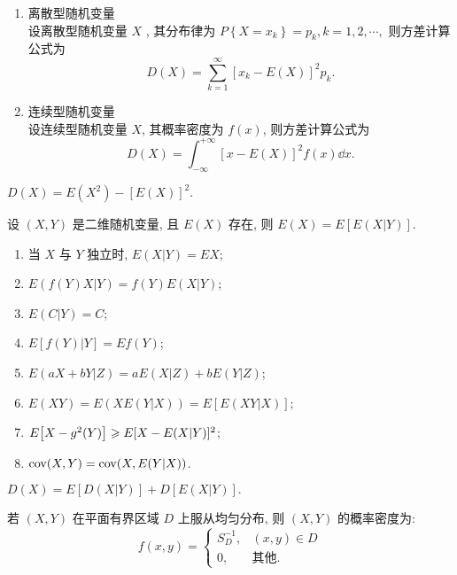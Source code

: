 \begin{enumerate}[label=(\arabic{*})]
    \item 离散型随机变量\\
    设离散型随机变量 $ X $ , 其分布律为 $P\left\{X=x_{k}\right\}=p_{k}, k=1,2, \cdots,$
    则方差计算公式为
    $$D(X)=\sum_{k=1}^{\infty}\left[x_{k}-E(X)\right]^{2} p_{k}.$$
    \item 连续型随机变量\\
    设连续型随机变量 $ X $, 其概率密度为 $ f(x) $, 则方差计算公式为
    $$D(X)=\int_{-\infty}^{+\infty}[x-E(X)]^{2} f(x) \dd  x .$$
\end{enumerate}

\begin{theorem}[方差与期望的联系]
    $D(X)=E\left(X^{2}\right)-[E(X)]^{2} .$
\end{theorem}

\begin{theorem}[重期望公式]
    设 $(X,Y)$ 是二维随机变量, 且 $E(X)$ 存在, 则 
    $E(X)=E[E(X|Y)].$
\end{theorem}

\begin{inference}[条件期望的性质]
    \begin{enumerate}[label=(\arabic{*})]
        \item 当 $X$ 与 $Y$ 独立时, $E(X|Y)=EX$;
        \item $E(f(Y)X|Y)=f(Y)E(X|Y)$;
        \item $E(C|Y)=C$;
        \item $E[f(Y)|Y]=Ef(Y)$;
        \item $E(aX+bY|Z)=aE(X|Z)+bE(Y|Z)$;
        \item $E(XY)=E(XE(Y|X))=E[E(XY|X)]$;
        \item $E\qty[X-g^2(Y)]\geqslant E[X-E(X|Y)]^2$;
        \item $\mathrm{cov}(X,Y)=\mathrm{cov}(X,E(Y|X))$.
    \end{enumerate}
    \label{cqwgstl}
\end{inference}

\begin{theorem}[全方差公式]
    \label{qfcgs}
    $D(X)=E[D(X|Y)]+D[E(X|Y)].$
\end{theorem}

\begin{theorem}[二维均匀分布的随机变量的概率密度]
    若 $(X,Y)$ 在平面有界区域 $D$ 上服从均匀分布, 则 $(X,Y)$ 的概率密度为:
    $$f(x,y)=\begin{cases}
            S_D^{-1}, & (x,y)\in D   \\
            0,        & \text{其他}.
        \end{cases}$$
\end{theorem}

